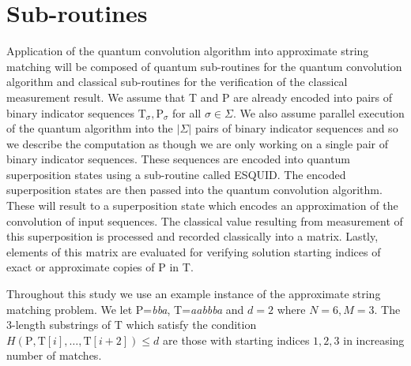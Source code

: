 \section{Sub-routines}\label{sec:sub-routines}
Application of the quantum convolution algorithm into approximate string matching will be composed of quantum sub-routines for the quantum convolution algorithm and classical sub-routines for the verification of the classical measurement result. We assume that T and P are already encoded into pairs of binary indicator sequences $\text{T}_{\sigma}, \text{P}_{\sigma}$ for all $\sigma \in \Sigma$. We also assume parallel execution of the quantum algorithm into the $\vert \Sigma \vert$ pairs of binary indicator sequences and so we describe the computation as though we are only working on a single pair of binary indicator sequences. These sequences are encoded into quantum superposition states using a sub-routine called ESQUID. The encoded superposition states are then passed into the quantum convolution algorithm. These will result to a superposition state which encodes an approximation of the convolution of input sequences. The classical value resulting from measurement of this superposition is processed and recorded classically into a matrix. Lastly, elements of this matrix are evaluated for verifying solution starting indices of exact or approximate copies of P in T.

Throughout this study we use an example instance of the approximate string matching problem. We let P=\textit{bba}, T=\textit{aabbba} and $d=2$ where $N=6, M=3$. The 3-length substrings of T which satisfy the condition $H\left( \mathrm{P},\mathrm{T}[i],\ldots,\mathrm{T}[i+2]\right) \leq d$ are those with starting indices $1, 2, 3$ in increasing number of matches.

